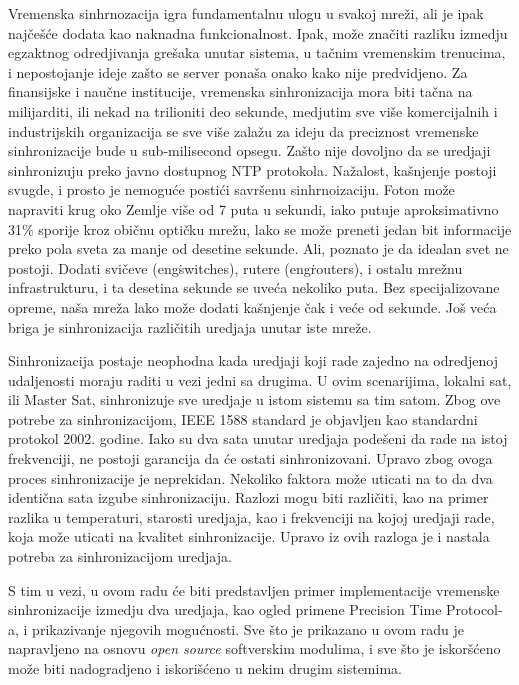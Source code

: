 \documentclass[a4paper,12pt, master]{etf}
\begin{document}
    Vremenska sinhrnozacija igra fundamentalnu ulogu u svakoj mre\v{z}i, ali je
	ipak naj\v{c}e\v{s}\'{c}e dodata kao naknadna funkcionalnost. Ipak,
	mo\v{z}e zna\v{c}iti razliku izmedju egzaktnog odredjivanja gre\v{s}aka
	unutar sistema, u ta\v{c}nim vremenskim trenucima, i nepostojanje ideje
	za\v{s}to se server pona\v{s}a onako kako nije predvidjeno. Za finansijske
	i nau\v{c}ne institucije, vremenska sinhronizacija mora biti ta\v{c}na na
	milijarditi, ili nekad na trilioniti deo sekunde, medjutim sve vi\v{s}e
	komercijalnih i industrijskih organizacija se sve vi\v{s}e zala\v{z}u za
	ideju da preciznost vremenske sinhronizacije bude u sub-milisecond opsegu.
	Za\v{s}to nije dovoljno da se uredjaji sinhronizuju preko javno dostupnog
	NTP protokola. Na\v{z}alost, ka\v{s}njenje postoji svugde, i prosto je
	nemogu\'{c}e posti\'{c}i savr\v{s}enu sinhrnoizaciju. Foton mo\v{z}e
    napraviti krug oko Zemlje vi\v{s}e od 7 puta u sekundi, iako putuje
    aproksimativno 31\% sporije kroz obi\v{c}nu opti\v{c}ku mre\v{z}u, lako se
    mo\v{z}e preneti jedan bit informacije preko pola sveta za manje od desetine
    sekunde. Ali, poznato je da idealan svet ne postoji. Dodati svi\v{c}eve
    (eng\. switches), rutere (eng\. routers), i ostalu mre\v{z}nu
    infrastrukturu, i ta desetina sekunde se uve\'{c}a nekoliko puta. Bez
    specijalizovane opreme, na\v{s}a mre\v{z}a lako mo\v{z}e dodati
    ka\v{s}njenje \v{c}ak i ve\'{c}e od sekunde. Jo\v{s} ve\'{c}a briga je
    sinhronizacija razli\v{c}itih uredjaja unutar iste mre\v{z}e.

	Sinhronizacija postaje neophodna kada uredjaji koji rade zajedno na
	odredjenoj udaljenosti moraju raditi u vezi jedni sa drugima. U ovim
	scenarijima, lokalni sat, ili Master Sat, sinhronizuje sve uredjaje u istom
	sistemu sa tim satom. Zbog ove potrebe za sinhronizacijom, IEEE 1588
	standard je objavljen kao standardni protokol 2002. godine. Iako su dva
	sata unutar uredjaja pode\v{s}eni da rade na istoj frekvenciji, ne postoji
	garancija da \'{c}e ostati sinhronizovani. Upravo zbog ovoga proces
	sinhronizacije je neprekidan. Nekoliko faktora mo\v{z}e uticati na to da
	dva identi\v{c}na sata izgube sinhronizaciju. Razlozi mogu biti
	razli\v{c}iti, kao na primer razlika u temperaturi, starosti uredjaja, kao
	i frekvenciji na kojoj uredjaji rade, koja mo\v{z}e uticati na kvalitet
	sinhronizacije. Upravo iz ovih razloga je i	nastala potreba za
	sinhronizacijom uredjaja.

	S tim u vezi, u ovom radu \'{c}e biti predstavljen primer implementacije
	vremenske sinhronizacije izmedju dva uredjaja, kao ogled primene Precision
	Time Protocol-a, i prikazivanje njegovih mogu\'{c}nosti. Sve \v{s}to je
	prikazano u ovom radu je napravljeno na osnovu \textit{open source}
	softverskim modulima, i sve \v{s}to je iskor\v{s}\'{c}eno mo\v{z}e biti
	nadogradjeno i iskori\v{s}\'{c}eno u nekim drugim sistemima.
\end{document}
